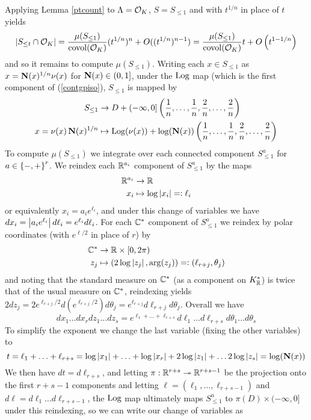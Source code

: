 \documentclass[11pt]{report}
\begin{document}
Applying Lemma \ref{ptcount} to $\Lambda = \mathcal{O}_K$, $S = S_{\leq 1}$ and with $t^{1/n}$ in place of $t$ yields
\begin{align}
    \left| S_{\leq t} \cap \mathcal{O}_K \right| = \frac{\mu(S_{\leq 1})}{\operatorname{covol}(\mathcal{O}_K)}(t^{1/n})^n + O((t^{1/n})^{n - 1}) = \frac{\mu(S_{\leq 1})}{\operatorname{covol}(\mathcal{O}_K)}t + O\left(  t^{1 - 1/n}  \right)
\end{align}
and so it remains to compute $\mu(S_{\leq 1})$. Writing each $x \in S_{\leq 1}$ as $x = \operatorname{\mathbf{N}}(x)^{1/n}\nu(x)$ for $\operatorname{\mathbf{N}}(x) \in (0, 1]$, under the $\operatorname{Log}$ map (which is the first component of (\ref{contgpiso}), $S_{\leq 1}$ is mapped by
\begin{align*}
    S_{\leq 1} &\to D + (-\infty, 0]\left(  \frac1n, \ldots, \frac1n, \frac2n, \ldots, \frac2n  \right) \\
    x = \nu(x)\operatorname{\mathbf{N}}(x)^{1/n} &\mapsto \operatorname{Log}(\nu(x)) + \log(\operatorname{\mathbf{N}}(x))\left(  \frac1n, \ldots, \frac1n, \frac2n, \ldots, \frac2n  \right)
\end{align*}
To compute $\mu(S_{\leq 1})$ we integrate over each connected component $S_{\leq 1}^a$ for $a \in \left\{  -, +  \right\}^r$. We reindex each $\mathbb{R}^{a_i}$ component of $S_{\leq 1}^a$ by the maps
\begin{align*}
    \mathbb{R}^{a_i} &\to \mathbb{R} \\
    x_i &\mapsto \log\left| x_i \right| =\vcentcolon \ell_i
\end{align*}
or equivalently $x_i = a_ie^{\ell_i}$, and under this change of variables we have $dx_i = \left| a_ie^{\ell_i} \right|d\ell_i = e^{\ell_i}d\ell_i$. For each $\mathbb{C}^*$ component of $S_{\leq 1}^a$ we reindex by polar coordinates (with $e^{\ell/2}$ in place of $r$) by
\begin{align*}
    \mathbb{C}^* &\to \mathbb{R} \times [0, 2\pi) \\
    z_j &\mapsto (2\log\left| z_j \right|, \arg(z_j)) =\vcentcolon (\ell_{r + j}, \theta_j)
\end{align*}
and noting that the standard measure on $\mathbb{C}^*$ (as a component on $K_{\mathbb{R}}^*$) is twice that of the usual measure on $\mathbb{C}^*$, reindexing yields $2dz_j = 2e^{\ell_{r + j}/2}d(e^{\ell_{r + j}/2})d\theta_j = e^{\ell_{r + j}}d\ell_{r + j}d\theta_j$. Overall we have
$$
    dx_1 \ldots dx_r dz_1 \ldots dz_s = e^{\ell_1 + \ldots + \ell_{r + s}}d\ell_1 \ldots d\ell_{r + s}d\theta_1 \ldots d\theta_s
$$
To simplify the exponent we change the last variable (fixing the other variables) to 
$$
    t = \ell_1 + \ldots + \ell_{r + s} = \log\left| x_1 \right| + \ldots + \log\left| x_r \right| + 2\log\left| z_1 \right| + \ldots 2\log\left| z_s \right| = \log(\operatorname{\mathbf{N}}(x))
$$
We then have $dt = d\ell_{r + s}$, and letting $\pi : \mathbb{R}^{r + s} \twoheadrightarrow \mathbb{R}^{r + s - 1}$ be the projection onto the first $r + s - 1$ components and letting $\ell = (\ell_1, \ldots, \ell_{r + s - 1})$ and $d\ell = d\ell_1 \ldots d\ell_{r + s - 1}$, the $\operatorname{Log}$ map ultimately maps $S_{\leq 1}^a$ to $\pi(D) \times (-\infty, 0]$ under this reindexing, so we can write our change of variables as
\end{document}
